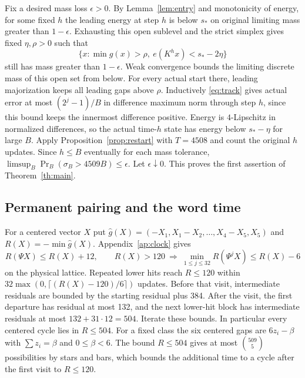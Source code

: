 \documentclass[11pt,reqno]{amsart}
\theoremstyle{remark}
\begin{document}
Fix a desired mass loss \(\epsilon>0\). By Lemma~\ref{lem:entry} and monotonicity of energy, for some fixed \(h\) the leading energy at step \(h\) is below \(s_*\) on original limiting mass greater than \(1-\epsilon\). Exhausting this open sublevel and the strict simplex gives fixed \(\eta,\rho>0\) such that
\[
 \{x:\min g(x)>\rho,\ e(K^hx)<s_*-2\eta\}
\]
still has mass greater than \(1-\epsilon\). Weak convergence bounds the limiting discrete mass of this open set from below. For every actual start there, leading majorization keeps all leading gaps above \(\rho\). Inductively \eqref{eq:track} gives actual error at most \((2^j-1)/B\) in difference maximum norm through step \(h\), since this bound keeps the innermost difference positive. Energy is \(4\)-Lipschitz in normalized differences, so the actual time-\(h\) state has energy below \(s_*-\eta\) for large \(B\). Apply Proposition~\ref{prop:restart} with \(T=4508\) and count the original \(h\) updates. Since \(h\le B\) eventually for each mass tolerance, \(\limsup_B\Pr_B(\sigma_B>4509B)\le\epsilon\). Let \(\epsilon\downarrow0\). This proves the first assertion of Theorem~\ref{th:main}.

\subsection{Permanent pairing and the word time}
For a centered vector \(X\) put \(\widehat g(X)=(-X_1,X_1-X_2,\ldots,X_4-X_5,X_5)\) and \(R(X)=-\min\widehat g(X)\). Appendix~\ref{ap:clock} gives
\begin{equation}\label{eq:clock}
 R(\Psi X)\le R(X)+12,\qquad
 R(X)>120\ \Longrightarrow\ \min_{1\le j\le32}R(\Psi^jX)\le R(X)-6
\end{equation}
on the physical lattice. Repeated lower hits reach \(R\le120\) within \(32\max(0,\lceil(R(X)-120)/6\rceil)\) updates. Before that visit, intermediate residuals are bounded by the starting residual plus 384. After the visit, the first departure has residual at most 132, and the next lower-hit block has intermediate residuals at most \(132+31\cdot12=504\). Iterate these bounds. In particular every centered cycle lies in \(R\le504\). For a fixed class the six centered gaps are \(6z_i-\beta\) with \(\sum z_i=\beta\) and \(0\le\beta<6\). The bound \(R\le504\) gives at most \(\binom{509}{5}\) possibilities by stars and bars, which bounds the additional time to a cycle after the first visit to \(R\le120\).
\end{document}
